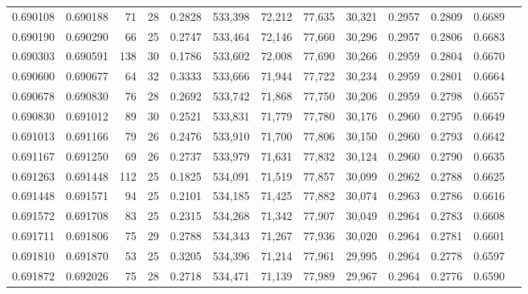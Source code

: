 \begin{tabular}{rrrrrrrrrrrrr}
0.690108 & 0.690188 &    71 &  28 &                                     0.2828 & 533,398 &  72,212 &  77,635 &  30,321 & 0.2957 & 0.2809 & 0.6689 \\
0.690190 & 0.690290 &    66 &  25 &                                     0.2747 & 533,464 &  72,146 &  77,660 &  30,296 & 0.2957 & 0.2806 & 0.6683 \\
0.690303 & 0.690591 &   138 &  30 &                                     0.1786 & 533,602 &  72,008 &  77,690 &  30,266 & 0.2959 & 0.2804 & 0.6670 \\
0.690600 & 0.690677 &    64 &  32 &                                     0.3333 & 533,666 &  71,944 &  77,722 &  30,234 & 0.2959 & 0.2801 & 0.6664 \\
0.690678 & 0.690830 &    76 &  28 &                                     0.2692 & 533,742 &  71,868 &  77,750 &  30,206 & 0.2959 & 0.2798 & 0.6657 \\
0.690830 & 0.691012 &    89 &  30 &                                     0.2521 & 533,831 &  71,779 &  77,780 &  30,176 & 0.2960 & 0.2795 & 0.6649 \\
0.691013 & 0.691166 &    79 &  26 &                                     0.2476 & 533,910 &  71,700 &  77,806 &  30,150 & 0.2960 & 0.2793 & 0.6642 \\
0.691167 & 0.691250 &    69 &  26 &                                     0.2737 & 533,979 &  71,631 &  77,832 &  30,124 & 0.2960 & 0.2790 & 0.6635 \\
0.691263 & 0.691448 &   112 &  25 &                                     0.1825 & 534,091 &  71,519 &  77,857 &  30,099 & 0.2962 & 0.2788 & 0.6625 \\
0.691448 & 0.691571 &    94 &  25 &                                     0.2101 & 534,185 &  71,425 &  77,882 &  30,074 & 0.2963 & 0.2786 & 0.6616 \\
0.691572 & 0.691708 &    83 &  25 &                                     0.2315 & 534,268 &  71,342 &  77,907 &  30,049 & 0.2964 & 0.2783 & 0.6608 \\
0.691711 & 0.691806 &    75 &  29 &                                     0.2788 & 534,343 &  71,267 &  77,936 &  30,020 & 0.2964 & 0.2781 & 0.6601 \\
0.691810 & 0.691870 &    53 &  25 &                                     0.3205 & 534,396 &  71,214 &  77,961 &  29,995 & 0.2964 & 0.2778 & 0.6597 \\
0.691872 & 0.692026 &    75 &  28 &                                     0.2718 & 534,471 &  71,139 &  77,989 &  29,967 & 0.2964 & 0.2776 & 0.6590 \\

\end{tabular}
